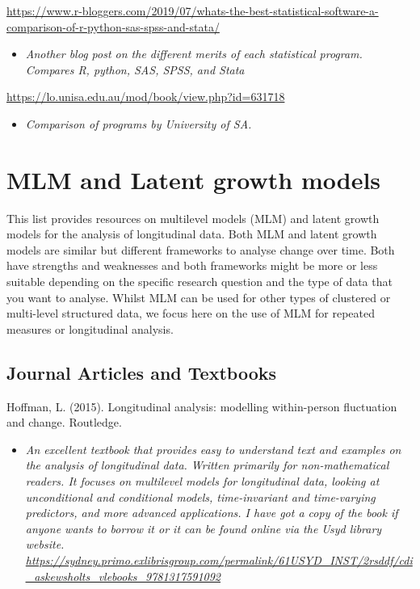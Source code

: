 \documentclass[
]{book}
\providecommand{\tightlist}{%
  \setlength{\itemsep}{0pt}\setlength{\parskip}{0pt}}
\begin{document}
\url{https://www.r-bloggers.com/2019/07/whats-the-best-statistical-software-a-comparison-of-r-python-sas-spss-and-stata/}

\begin{itemize}
\tightlist
\item
  \emph{Another blog post on the different merits of each statistical program. Compares R, python, SAS, SPSS, and Stata}
\end{itemize}

\url{https://lo.unisa.edu.au/mod/book/view.php?id=631718}

\begin{itemize}
\tightlist
\item
  \emph{Comparison of programs by University of SA.}
\end{itemize}

\hypertarget{mlm-and-latent-growth-models}{%
\chapter{MLM and Latent growth models}\label{mlm-and-latent-growth-models}}

This list provides resources on multilevel models (MLM) and latent growth models for the analysis of longitudinal data. Both MLM and latent growth models are similar but different frameworks to analyse change over time. Both have strengths and weaknesses and both frameworks might be more or less suitable depending on the specific research question and the type of data that you want to analyse. Whilst MLM can be used for other types of clustered or multi-level structured data, we focus here on the use of MLM for repeated measures or longitudinal analysis.

\hypertarget{journal-articles-and-textbooks-2}{%
\section{Journal Articles and Textbooks}\label{journal-articles-and-textbooks-2}}

Hoffman, L. (2015). Longitudinal analysis: modelling within-person fluctuation and change. Routledge.

\begin{itemize}
\tightlist
\item
  \emph{An excellent textbook that provides easy to understand text and examples on the analysis of longitudinal data. Written primarily for non-mathematical readers. It focuses on multilevel models for longitudinal data, looking at unconditional and conditional models, time-invariant and time-varying predictors, and more advanced applications. I have got a copy of the book if anyone wants to borrow it or it can be found online via the Usyd library website. \url{https://sydney.primo.exlibrisgroup.com/permalink/61USYD_INST/2rsddf/cdi_askewsholts_vlebooks_9781317591092} }
\end{itemize}
\end{document}
